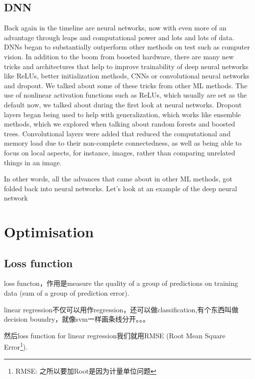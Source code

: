 \subsection{DNN}
 	Back again in the timeline are neural networks, now with even more of an advantage through leaps and computational power and lots and lots of data. DNNs began to substantially outperform other methods on test such as computer vision. In addition to the boom from boosted hardware, there are many new tricks and architectures that help to improve trainability of deep neural networks like ReLUs, better initialization methods, CNNs or convolutional neural networks and dropout. 
 	We talked about some of these tricks from other ML methods. The use of nonlinear activation functions such as ReLUs, which usually are set as the default now, we talked about during the first look at neural networks. 
 	Dropout layers began being used to help with generalization, which works like ensemble methods, which we explored when talking about random forests and boosted trees. 
 	Convolutional layers were added that reduced the computational and memory load due to their non-complete connectedness, as well as being able to focus on local aspects, for instance, images, rather than comparing unrelated things in an image. 
 	
 	In other words, all the advances that came about in other ML methods, got folded back into neural networks. Let's look at an example of the deep neural network
 	
\section{Optimisation}
\subsection{Loss function}
loss functon，作用是measure the quality of a group of predictions on training data (sum of a group of prediction error).

linear regression不仅可以用作regression，还可以做classification,有个东西叫做decision boundry，就像svm一样画条线分开。。。

然后loss function for linear regression我们就用RMSE (Root Mean Square Error\footnote{RMSE: 之所以要加Root是因为计量单位问题}).

